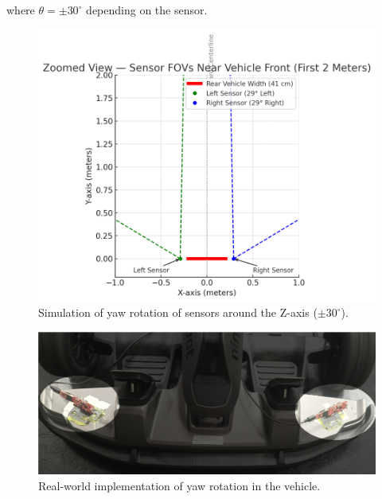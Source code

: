 where $\theta = \pm30^\circ$ depending on the sensor.

\begin{figure}[!htbp]
    \centering
    \includegraphics[width=0.8\linewidth]{images/SensorsRotation.png}
    \caption{Simulation of yaw rotation of sensors around the Z-axis ($\pm30^\circ$).}
    \label{fig:z_axis_rotation}
\end{figure}

\begin{figure}[!htbp]
    \centering
    \includegraphics[width=0.8\linewidth]{images/vehicleRadarYawRotationHighlited.png}
    \caption{Real-world implementation of yaw rotation in the vehicle.}
    \label{fig:vehicleRadarYawRotation}
\end{figure}

